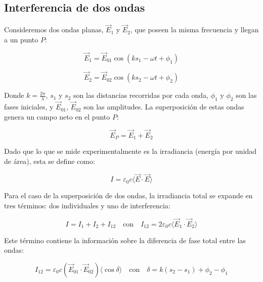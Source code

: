 \documentclass[article,12pt]{elsarticle}
\begin{document}
\subsection*{Interferencia de dos ondas}

Consideremos dos ondas planas, $\vec{E}_1$ y $\vec{E}_2$, que poseen la misma frecuencia y llegan a un punto $P$:

\begin{equation}
\vec{E}_1 = \vec{E}_{01} \cos(ks_1 - \omega t + \phi_1) \label{eq1}
\end{equation}
\cite{barrios2025interferencia}

\begin{equation}
\vec{E}_2 = \vec{E}_{02} \cos(ks_2 - \omega t + \phi_2) \label{eq2}
\end{equation}
\cite{barrios2025interferencia}

Donde $k = \frac{2\pi}{\lambda}$, $s_1$ y $s_2$ son las distancias recorridas por cada onda, $\phi_1$ y $\phi_2$ son las fases iniciales, y $\vec{E}_{01}$, $\vec{E}_{02}$ son las amplitudes. La superposición de estas ondas genera un campo neto en el punto $P$:

\begin{equation}
\vec{E}_P = \vec{E}_1 + \vec{E}_2 \label{eq3}
\end{equation}
\cite{barrios2025interferencia}

Dado que lo que se mide experimentalmente es la irradiancia (energía por unidad de área), esta se define como:

\begin{equation}
I = \varepsilon_0 c \langle \vec{E} \cdot \vec{E} \rangle \label{eq4}
\end{equation}
\cite{griffiths1999electrodynamics, barrios2025interferencia}

Para el caso de la superposición de dos ondas, la irradiancia total se expande en tres términos: dos individuales y uno de interferencia:

\begin{equation}
I = I_1 + I_2 + I_{12} \quad \text{con} \quad I_{12} = 2\varepsilon_0 c \langle \vec{E}_1 \cdot \vec{E}_2 \rangle \label{eq6}
\end{equation}
\cite{barrios2025interferencia}

Este término contiene la información sobre la diferencia de fase total entre las ondas:

\begin{equation}
I_{12} = \varepsilon_0 c (\vec{E}_{01} \cdot \vec{E}_{02}) \langle \cos \delta \rangle \quad \text{con} \quad \delta = k(s_2 - s_1) + \phi_2 - \phi_1 \label{eq7}
\end{equation}
\cite{barrios2025interferencia}
\end{document}
